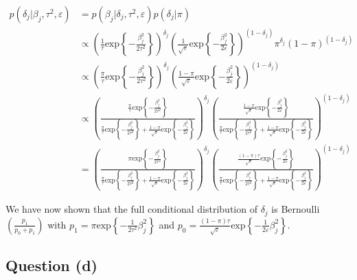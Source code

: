 \documentclass[
]{article}
\begin{document}
\begin{align*}
p(\delta_j | \beta_j, \tau^2, \varepsilon) &= p(\beta_j | \delta_j, \tau^2, \varepsilon) p(\delta_j | \pi) \\
  &\propto \left(\frac{1}{\tau}\text{exp}\left\{-\frac{\beta_j^2}{2\tau^2} \right\} \right)^{\delta_j} \left(\frac{1}{\sqrt{\varepsilon}} \text{exp}\left\{-\frac{\beta_j^2}{2\varepsilon} \right\} \right)^{(1-\delta_j)} \pi^{\delta_j}(1 - \pi)^{(1-\delta_j)} \\
  &\propto \left(\frac{\pi}{\tau}\text{exp}\left\{-\frac{\beta_j^2}{2\tau^2} \right\} \right)^{\delta_j} \left(\frac{1-\pi}{\sqrt{\varepsilon}} \text{exp}\left\{-\frac{\beta_j^2}{2\varepsilon} \right\} \right)^{(1-\delta_j)} \\
 &\propto \left(\frac{\frac{\pi}{\tau}\text{exp}\left\{-\frac{\beta_j^2}{2\tau^2} \right\}}{\frac{\pi}{\tau}\text{exp}\left\{-\frac{\beta_j^2}{2\tau^2} \right\} + \frac{1-\pi}{\sqrt{\varepsilon}} \text{exp}\left\{-\frac{\beta_j^2}{2\varepsilon} \right\}} \right)^{\delta_j} \left(\frac{\frac{1-\pi}{\sqrt{\varepsilon}} \text{exp}\left\{-\frac{\beta_j^2}{2\varepsilon} \right\}}{\frac{\pi}{\tau}\text{exp}\left\{-\frac{\beta_j^2}{2\tau^2} \right\} + \frac{1-\pi}{\sqrt{\varepsilon}} \text{exp}\left\{-\frac{\beta_j^2}{2\varepsilon} \right\}} \right)^{(1-\delta_j)} \\
 &= \left(\frac{\pi\text{exp}\left\{-\frac{\beta_j^2}{2\tau^2} \right\}}{\frac{\pi}{\tau}\text{exp}\left\{-\frac{\beta_j^2}{2\tau^2} \right\} + \frac{1-\pi}{\sqrt{\varepsilon}} \text{exp}\left\{-\frac{\beta_j^2}{2\varepsilon} \right\}} \right)^{\delta_j} \left(\frac{\frac{(1-\pi)\tau}{\sqrt{\varepsilon}} \text{exp}\left\{-\frac{\beta_j^2}{2\varepsilon} \right\}}{\frac{\pi}{\tau}\text{exp}\left\{-\frac{\beta_j^2}{2\tau^2} \right\} + \frac{1-\pi}{\sqrt{\varepsilon}} \text{exp}\left\{-\frac{\beta_j^2}{2\varepsilon} \right\}} \right)^{(1-\delta_j)}
\end{align*}

We have now shown that the full conditional distribution of \(\delta_j\)
is Bernoulli\(\displaystyle \left(\frac{p_1}{p_0 + p_1} \right)\) with
\(p_1 = \pi\text{exp}\left\{-\frac{1}{2\tau^2}\beta_j^2 \right\}\) and
\(\displaystyle p_0 = \frac{(1-\pi)\tau}{\sqrt{\varepsilon}} \text{exp}\left\{-\frac{1}{2\varepsilon} \beta_j^2 \right\}\).

\hypertarget{question-d}{%
\subsection{Question (d)}\label{question-d}}
\end{document}
